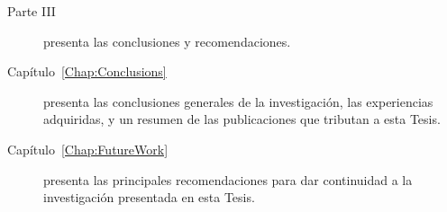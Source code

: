 \begin{description}
\item[Parte III] presenta las conclusiones y recomendaciones.

\item [Capítulo~\ref{Chap:Conclusions}] presenta las conclusiones generales de la investigación, las experiencias adquiridas, y un resumen de las publicaciones que tributan a esta Tesis.

\item [Capítulo~\ref{Chap:FutureWork}] presenta las principales recomendaciones para dar continuidad a la investigación presentada en esta Tesis.

\end{description}
